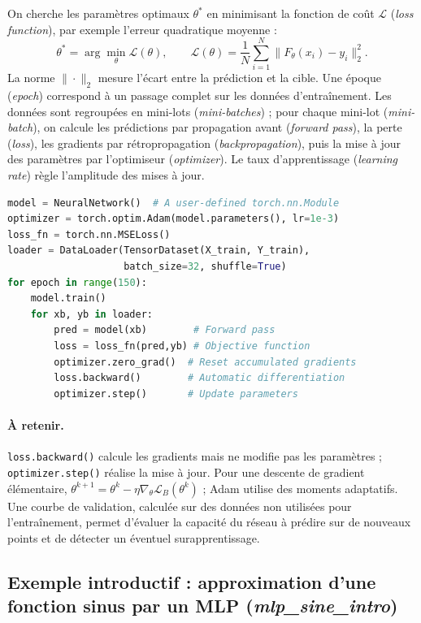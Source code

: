 \documentclass[11pt,a4paper]{article}
\begin{document}
On cherche les paramètres optimaux $\theta^*$ en minimisant la fonction de coût $\mathcal L$ (\textit{loss function}), par exemple l'erreur quadratique moyenne :
\[
\boxed{\theta^*=\arg\min_\theta\mathcal L(\theta),\qquad
\mathcal L(\theta)=\frac{1}{N}\sum_{i=1}^N\|F_\theta(x_i)-y_i\|_2^2.}
\]
La norme $\|\cdot\|_2$ mesure l'écart entre la prédiction et la cible. Une époque (\textit{epoch}) correspond à un passage complet sur les données d'entraînement. Les données sont regroupées en mini-lots (\textit{mini-batches}) ; pour chaque mini-lot (\textit{mini-batch}), on calcule les prédictions par propagation avant (\textit{forward pass}), la perte (\textit{loss}), les gradients par rétropropagation (\textit{backpropagation}), puis la mise à jour des paramètres par l'optimiseur (\textit{optimizer}). Le taux d'apprentissage (\textit{learning rate}) règle l'amplitude des mises à jour.
\begin{lstlisting}[language=Python]
model = NeuralNetwork()  # A user-defined torch.nn.Module
optimizer = torch.optim.Adam(model.parameters(), lr=1e-3)
loss_fn = torch.nn.MSELoss()
loader = DataLoader(TensorDataset(X_train, Y_train),
                    batch_size=32, shuffle=True)
for epoch in range(150):
    model.train()
    for xb, yb in loader:
        pred = model(xb)        # Forward pass
        loss = loss_fn(pred,yb) # Objective function
        optimizer.zero_grad()  # Reset accumulated gradients
        loss.backward()        # Automatic differentiation
        optimizer.step()       # Update parameters
\end{lstlisting}
\paragraph{À retenir.} \texttt{loss.backward()} calcule les gradients mais ne modifie pas les paramètres ; \texttt{optimizer.step()} réalise la mise à jour. Pour une descente de gradient élémentaire, $\theta^{k+1}=\theta^k-\eta\nabla_\theta\mathcal L_B(\theta^k)$ ; Adam utilise des moments adaptatifs. Une courbe de validation, calculée sur des données non utilisées pour l'entraînement, permet d'évaluer la capacité du réseau à prédire sur de nouveaux points et de détecter un éventuel surapprentissage.

\subsection{Exemple introductif : approximation d'une fonction sinus par un MLP (\textit{mlp\_sine\_intro})}
\end{document}
